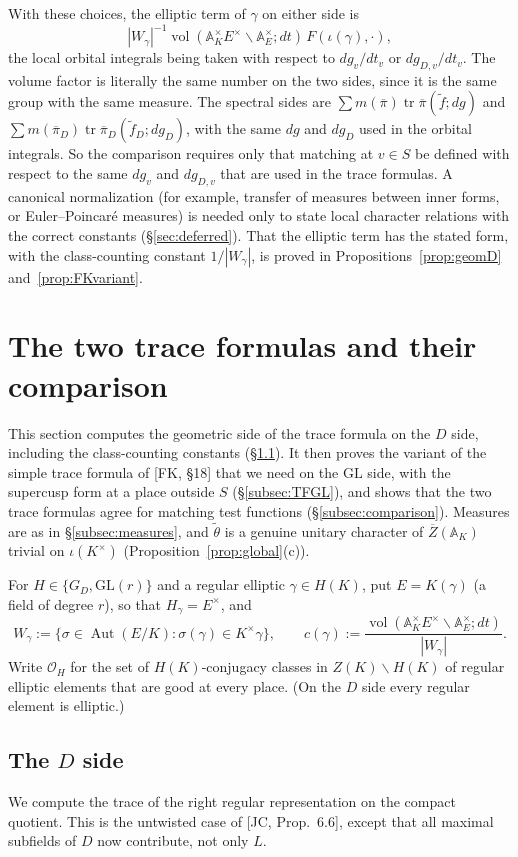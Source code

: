 \documentclass[12pt]{article}
\newcommand{\ov}[1]{\overline{#1}}
\newcommand{\A}{\mathbb{A}}
\newcommand{\tr}{\operatorname{tr}}
\newcommand{\Aut}{\operatorname{Aut}}
\newcommand{\vol}{\operatorname{vol}}
\newcommand{\GL}{\mathrm{GL}}
\newcommand{\Zb}{\ov{Z}}
\newcommand{\pib}{\ov{\pi}}
\theoremstyle{plain}
\theoremstyle{definition}
\begin{document}
With these choices, the elliptic term of $\gamma$ on either side is \[ |W_\gamma|^{-1}\vol(\A_K^\times E^\times\backslash\A_E^\times;dt)\,F(\iota(\gamma),\cdot), \] the local orbital integrals being taken with respect to $dg_v/dt_v$ or $dg_{D,v}/dt_v$. The volume factor is literally the same number on the two sides, since it is the same group with the same measure. The spectral sides are $\sum m(\pib)\tr\pib(\tilde f;dg)$ and $\sum m(\pib_D)\tr\pib_D(\tilde f_D;dg_D)$, with the same $dg$ and $dg_D$ used in the orbital integrals. So the comparison requires only that matching at $v\in S$ be defined with respect to the same $dg_v$ and $dg_{D,v}$ that are used in the trace formulas. A canonical normalization (for example, transfer of measures between inner forms, or Euler--Poincar\'e measures) is needed only to state local character relations with the correct constants (\S\ref{sec:deferred}). That the elliptic term has the stated form, with the class-counting constant $1/|W_\gamma|$, is proved in Propositions~\ref{prop:geomD} and~\ref{prop:FKvariant}.

\section{The two trace formulas and their comparison}\label{sec:TF}
This section computes the geometric side of the trace formula on the $D$ side, including the class-counting constants (\S\ref{subsec:TFD}). It then proves the variant of the simple trace formula of [FK, \S18] that we need on the $\GL$ side, with the supercusp form at a place outside $S$ (\S\ref{subsec:TFGL}), and shows that the two trace formulas agree for matching test functions (\S\ref{subsec:comparison}). Measures are as in \S\ref{subsec:measures}, and $\tilde\theta$ is a genuine unitary character of $\Zb(\A_K)$ trivial on $\iota(K^\times)$ (Proposition~\ref{prop:global}(c)).

For $H\in\{G_D,\GL(r)\}$ and a regular elliptic $\gamma\in H(K)$, put $E=K(\gamma)$ (a field of degree $r$), so that $H_\gamma=E^\times$, and
\[ W_\gamma:=\{\sigma\in\Aut(E/K):\sigma(\gamma)\in K^\times\gamma\},\qquad c(\gamma):=\frac{\vol(\A_K^\times E^\times\backslash\A_E^\times;dt)}{|W_\gamma|}. \]
Write $\mathcal O_H$ for the set of $H(K)$-conjugacy classes in $Z(K)\backslash H(K)$ of regular elliptic elements that are good at every place. (On the $D$ side every regular element is elliptic.)

\subsection{The $D$ side}\label{subsec:TFD}
We compute the trace of the right regular representation on the compact quotient. This is the untwisted case of [JC, Prop.~6.6], except that all maximal subfields of $D$ now contribute, not only $L$.
\end{document}
